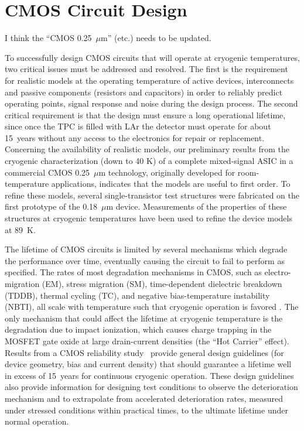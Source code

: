 %
\section{CMOS Circuit Design}
\label{sec:fe-CMOS}

\begin{editornote}
  I think the ``CMOS 0.25~$\mu$m'' (etc.) needs to be updated.
\end{editornote}
To successfully design CMOS circuits that will operate at cryogenic 
temperatures, two critical issues must be addressed and resolved. 
The first is the requirement for realistic models at the operating temperature 
of active devices, interconnects and passive components (resistors and 
capacitors) in order to reliably predict operating points, signal response 
and noise during the design process. The second critical requirement is 
that the design must ensure a long operational lifetime, since once the TPC is filled 
with LAr the detector must operate for about 15~years without any access to the 
electronics for repair or replacement. Concerning the availability of realistic models, 
our preliminary results from the cryogenic characterization (down to 40 K) of a complete 
mixed-signal ASIC \cite{CMOS-Compton} in a commercial CMOS 0.25~$\mu$m technology, 
originally developed for room-temperature applications, indicates that the models 
are useful to first order.
To refine these models, several 
single-transistor test structures were fabricated on the first prototype of the 0.18~$\mu$m device. 
Measurements of the properties of these structures at cryogenic temperatures 
have been used to refine the device models at 89~K. 

The lifetime of CMOS circuits is limited by several mechanisms which degrade 
the performance over time, eventually causing the circuit to fail to perform as specified. 
The rates of most degradation mechanisms in CMOS, such as electro-migration (EM), 
stress migration (SM), time-dependent dielectric breakdown (TDDB), thermal cycling (TC), 
and negative bias-temperature instability (NBTI), all scale with temperature such that 
cryogenic operation is favored \cite{CMOS-lifetime}\cite{PMOS-model}. The only mechanism 
that could affect the lifetime at cryogenic temperature is the degradation due to 
impact ionization, which causes charge trapping in the MOSFET gate oxide at 
large drain-current densities (the ``Hot Carrier'' effect). Results from a CMOS reliability study~\cite{CMOS-reliability} 
provide general design guidelines (for device geometry, bias and current density) 
that should guarantee a lifetime well in excess of 15~years for continuous cryogenic operation. 
These design guidelines also provide information for designing test conditions to observe the 
deterioration mechanism and to extrapolate from accelerated deterioration rates, 
measured under stressed conditions within practical times, to the ultimate lifetime under normal operation.

